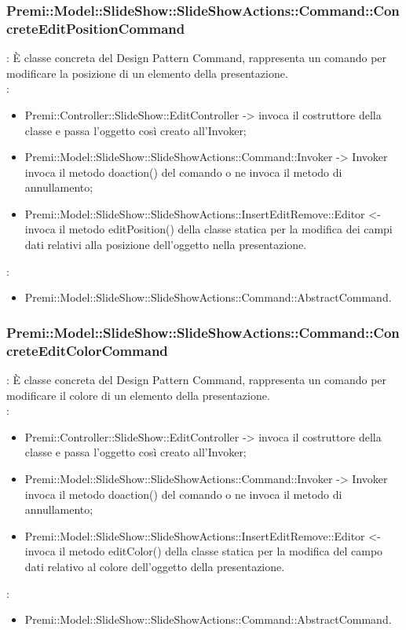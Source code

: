 {                    \subsubsection{Premi::Model::SlideShow::SlideShowActions::Command::ConcreteEditPositionCommand}{
				\textbf{\tipo}: È classe concreta del Design Pattern Command, rappresenta un comando per modificare la posizione di un elemento della presentazione.\\	
				\textbf{\relaz}: 
				\begin{itemize}
					\item Premi::Controller::SlideShow::EditController -> invoca il costruttore della classe e passa l’oggetto così creato all’Invoker;
					\item Premi::Model::SlideShow::SlideShowActions::Command::Invoker -> Invoker invoca il metodo doaction() del comando o ne invoca il metodo di annullamento;
                    \item Premi::Model::SlideShow::SlideShowActions::InsertEditRemove::Editor <- invoca il metodo editPosition() della classe statica per la modifica dei campi dati relativi alla posizione dell'oggetto nella presentazione.
				\end{itemize}	
                \textbf{\base}: 
                    \begin{itemize}
                    \item Premi::Model::SlideShow::SlideShowActions::Command::AbstractCommand.
                    \end{itemize}
                    }
                    \subsubsection{Premi::Model::SlideShow::SlideShowActions::Command::ConcreteEditColorCommand}{
				\textbf{\tipo}: È classe concreta del Design Pattern Command, rappresenta un comando per modificare il colore di un elemento della presentazione.\\	
				\textbf{\relaz}: 
				\begin{itemize}
					\item Premi::Controller::SlideShow::EditController -> invoca il costruttore della classe e passa l’oggetto così creato all’Invoker;
					\item Premi::Model::SlideShow::SlideShowActions::Command::Invoker -> Invoker invoca il metodo doaction() del comando o ne invoca il metodo di annullamento;
                    \item Premi::Model::SlideShow::SlideShowActions::InsertEditRemove::Editor <- invoca il metodo editColor() della classe statica per la modifica del campo dati relativo al colore dell'oggetto della presentazione.
				\end{itemize}	
                \textbf{\base}: 
                    \begin{itemize}
                    \item Premi::Model::SlideShow::SlideShowActions::Command::AbstractCommand.
                    \end{itemize}
                    }
}
